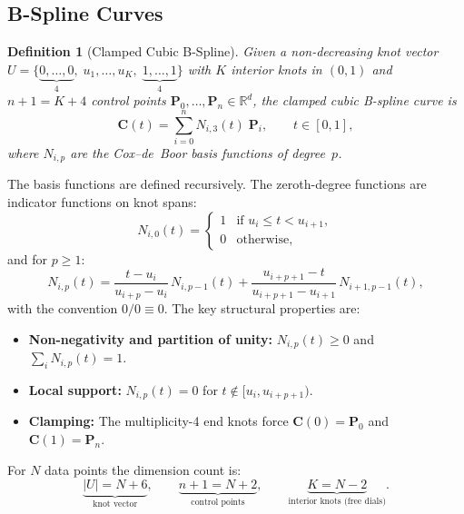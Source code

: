 \documentclass[11pt, a4paper]{article}
\newtheorem{definition}{Definition}
\newcommand{\R}{\mathbb{R}}
\newcommand{\bC}{\mathbf{C}}
\newcommand{\bP}{\mathbf{P}}
\begin{document}
\subsection{B-Spline Curves}

\begin{definition}[Clamped Cubic B-Spline]
Given a non-decreasing \emph{knot vector}
$U = \{\underbrace{0,\dots,0}_{4},\; u_1,\dots,u_K,\;
       \underbrace{1,\dots,1}_{4}\}$
with $K$ interior knots in $(0,1)$ and $n+1 = K + 4$ control points
$\bP_0,\dots,\bP_n \in \R^d$, the \emph{clamped cubic B-spline curve} is
\begin{equation}
  \bC(t) = \sum_{i=0}^{n} N_{i,3}(t)\;\bP_i, \qquad t \in [0,1],
  \label{eq:bspline}
\end{equation}
where $N_{i,p}$ are the Cox--de~Boor basis functions of degree~$p$.
\end{definition}

The basis functions are defined recursively. The zeroth-degree functions are
indicator functions on knot spans:
\begin{equation}
  N_{i,0}(t) =
  \begin{cases}
    1 & \text{if } u_i \leq t < u_{i+1},\\
    0 & \text{otherwise},
  \end{cases}
  \label{eq:basis0}
\end{equation}
and for $p \geq 1$:
\begin{equation}
  N_{i,p}(t) =
  \frac{t - u_i}{u_{i+p} - u_i}\,N_{i,p-1}(t)
  + \frac{u_{i+p+1} - t}{u_{i+p+1} - u_{i+1}}\,N_{i+1,p-1}(t),
  \label{eq:coxdeboor}
\end{equation}
with the convention $0/0 \equiv 0$. The key structural properties are:

\begin{itemize}
  \item \textbf{Non-negativity and partition of unity:}
        $N_{i,p}(t) \geq 0$ and $\sum_i N_{i,p}(t) = 1$.
  \item \textbf{Local support:}
        $N_{i,p}(t) = 0$ for $t \notin [u_i, u_{i+p+1})$.
  \item \textbf{Clamping:}
        The multiplicity-4 end knots force
        $\bC(0) = \bP_0$ and $\bC(1) = \bP_n$.
\end{itemize}

For $N$ data points the dimension count is:
\begin{equation}
  \underbrace{|U| = N + 6}_{\text{knot vector}},\qquad
  \underbrace{n + 1 = N + 2}_{\text{control points}},\qquad
  \underbrace{K = N - 2}_{\text{interior knots (free dials)}}.
  \label{eq:dimensions}
\end{equation}
\end{document}
